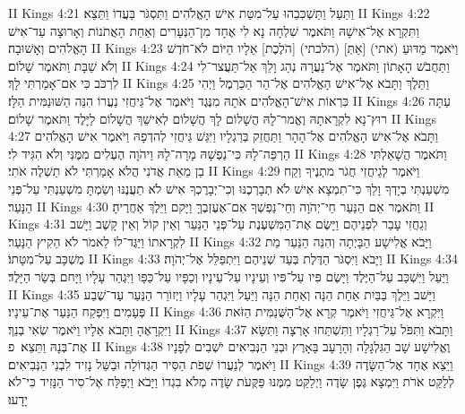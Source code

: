 II Kings 4:21	וַתַּעַל וַתַּשְׁכִּבֵהוּ עַל־מִטַּת אִישׁ הָאֱלֹהִים וַתִּסְגֹּר בַּעֲדוֹ וַתֵּצֵא׃
II Kings 4:22	וַתִּקְרָא אֶל־אִישָׁהּ וַתֹּאמֶר שִׁלְחָה נָא לִי אֶחָד מִן־הַנְּעָרִים וְאַחַת הָאֲתֹנוֹת וְאָרוּצָה עַד־אִישׁ הָאֱלֹהִים וְאָשׁוּבָה׃
II Kings 4:23	וַיֹּאמֶר מַדּוּעַ (אתי) [אַתְּ] (הלכתי) [הֹלֶכֶת] אֵלָיו הַיּוֹם לֹא־חֹדֶשׁ וְלֹא שַׁבָּת וַתֹּאמֶר שָׁלוֹם׃
II Kings 4:24	וַתַּחֲבֹשׁ הָאָתוֹן וַתֹּאמֶר אֶל־נַעֲרָהּ נְהַג וָלֵךְ אַל־תַּעֲצר־לִי לִרְכֹּב כִּי אִם־אָמַרְתִּי לָךְ׃
II Kings 4:25	וַתֵּלֶךְ וַתָּבֹא אֶל־אִישׁ הָאֱלֹהִים אֶל־הַר הַכַּרְמֶל וַיְהִי כִּרְאוֹת אִישׁ־הָאֱלֹהִים אֹתָהּ מִנֶּגֶד וַיֹּאמֶר אֶל־גֵּיחֲזִי נַעֲרוֹ הִנֵּה הַשּׁוּנַמִּית הַלָּז׃
II Kings 4:26	עַתָּה רוּץ־נָא לִקְרָאתָהּ וֶאֱמר־לָהּ הֲשָׁלוֹם לָךְ הֲשָׁלוֹם לְאִישֵׁךְ הֲשָׁלוֹם לַיָּלֶד וַתֹּאמֶר שָׁלוֹם׃
II Kings 4:27	וַתָּבֹא אֶל־אִישׁ הָאֱלֹהִים אֶל־הָהָר וַתַּחֲזֵק בְּרַגְלָיו וַיִּגַּשׁ גֵּיחֲזִי לְהדְפָהּ וַיֹּאמֶר אִישׁ הָאֱלֹהִים הַרְפֵּה־לָהּ כִּי־נַפְשָׁהּ מָרָה־לָהּ וַיהֹוָה הֶעְלִים מִמֶּנִּי וְלֹא הִגִּיד לִי׃
II Kings 4:28	וַתֹּאמֶר הֲשָׁאַלְתִּי בֵן מֵאֵת אֲדֹנִי הֲלֹא אָמַרְתִּי לֹא תַשְׁלֶה אֹתִי׃
II Kings 4:29	וַיֹּאמֶר לְגֵיחֲזִי חֲגֹר מתְנֶיךָ וְקַח מִשְׁעַנְתִּי בְיָדְךָ וָלֵךְ כִּי־תִמְצָא אִישׁ לֹא תְבָרְכֶנּוּ וְכִי־יְבָרֶכְךָ אִישׁ לֹא תַעֲנֶנּוּ וְשַׂמְתָּ מִשְׁעַנְתִּי עַל־פְּנֵי הַנָּעַר׃
II Kings 4:30	וַתֹּאמֶר אֵם הַנַּעַר חַי־יְהֹוָה וְחֵי־נַפְשְׁךָ אִם־אֶעֶזְבֶךָּ וַיָּקם וַיֵּלֶךְ אַחֲרֶיהָ׃
II Kings 4:31	וְגֵחֲזִי עָבַר לִפְנֵיהֶם וַיָּשֶׂם אֶת־הַמִּשְׁעֶנֶת עַל־פְּנֵי הַנַּעַר וְאֵין קוֹל וְאֵין קָשֶׁב וַיָּשׁב לִקְרָאתוֹ וַיַּגֶּד־לוֹ לֵאמֹר לֹא הֵקִיץ הַנָּעַר׃
II Kings 4:32	וַיָּבֹא אֱלִישָׁע הַבָּיְתָה וְהִנֵּה הַנַּעַר מֵת מֻשְׁכָּב עַל־מִטָּתוֹ׃
II Kings 4:33	וַיָּבֹא וַיִּסְגֹּר הַדֶּלֶת בְּעַד שְׁנֵיהֶם וַיִּתְפַּלֵּל אֶל־יְהֹוָה׃
II Kings 4:34	וַיַּעַל וַיִּשְׁכַּב עַל־הַיֶּלֶד וַיָּשֶׂם פִּיו עַל־פִּיו וְעֵינָיו עַל־עֵינָיו וְכַפָּיו עַל־כַּפָּו וַיִּגְהַר עָלָיו וַיָּחם בְּשַׂר הַיָּלֶד׃
II Kings 4:35	וַיָּשׁב וַיֵּלֶךְ בַּבַּיִת אַחַת הֵנָּה וְאַחַת הֵנָּה וַיַּעַל וַיִּגְהַר עָלָיו וַיְזוֹרֵר הַנַּעַר עַד־שֶׁבַע פְּעָמִים וַיִּפְקַח הַנַּעַר אֶת־עֵינָיו׃
II Kings 4:36	וַיִּקְרָא אֶל־גֵּיחֲזִי וַיֹּאמֶר קְרָא אֶל־הַשֻּׁנַמִּית הַזֹּאת וַיִּקְרָאֶהָ וַתָּבֹא אֵלָיו וַיֹּאמֶר שְׂאִי בְנֵךְ׃
II Kings 4:37	וַתָּבֹא וַתִּפֹּל עַל־רַגְלָיו וַתִּשְׁתַּחוּ אָרְצָה וַתִּשָּׂא אֶת־בְּנָהּ וַתֵּצֵא׃ {פ}
II Kings 4:38	וֶאֱלִישָׁע שָׁב הַגִּלְגָּלָה וְהָרָעָב בָּאָרֶץ וּבְנֵי הַנְּבִיאִים יֹשְׁבִים לְפָנָיו וַיֹּאמֶר לְנַעֲרוֹ שְׁפֹת הַסִּיר הַגְּדוֹלָה וּבַשֵּׁל נָזִיד לִבְנֵי הַנְּבִיאִים׃
II Kings 4:39	וַיֵּצֵא אֶחָד אֶל־הַשָּׂדֶה לְלַקֵּט אֹרֹת וַיִּמְצָא גֶּפֶן שָׂדֶה וַיְלַקֵּט מִמֶּנּוּ פַּקֻּעֹת שָׂדֶה מְלֹא בִגְדוֹ וַיָּבֹא וַיְפַלַּח אֶל־סִיר הַנָּזִיד כִּי־לֹא יָדָעוּ׃
